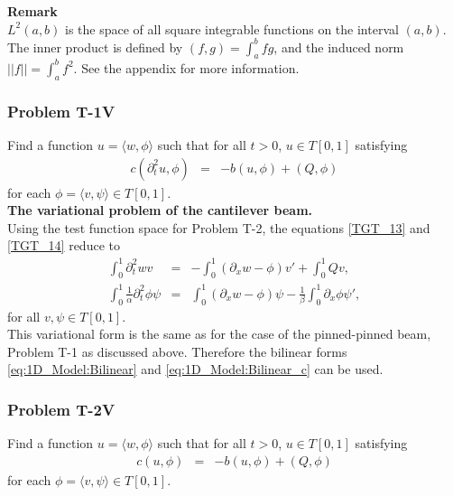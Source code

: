 \documentclass[../../main.tex]{subfiles}
\begin{document}
    \textbf{Remark}\\
    $L^2(a,b)$ is the space of all square integrable functions on the interval $(a,b)$. The inner product is defined by $\displaystyle (f,g) = \int_a^b fg$, and the induced norm $\displaystyle ||f|| = \int_a^b f^2$. See the appendix for more information.\\

    \subsubsection*{Problem T-1V}\label{sssec:1D_Model:ProblemT1V}
    Find a function ${u} = \langle w, \phi \rangle$ such that for all $t >0$, ${u} \in  T[0,1]$ satisfying
    \begin{eqnarray}
        c(\partial_t^2 u,{\phi}) &=& -b({u},{\phi}) + (Q,{\phi})
    \end{eqnarray} for each ${\phi} = \langle v, \psi \rangle \in T[0,1]$. \\

    \textbf{The variational problem of the cantilever beam.}\\

    Using the test function space for Problem T-2, the equations \eqref{TGT_13} and \eqref{TGT_14} reduce to
    \begin{eqnarray}
        \int_{0}^{1} \partial_{t}^{2} w v &=& -\int_{0}^{1}(\partial_x w - \phi) v' + \int_{0}^{1} Q v, \label{eq:1D_Model:ProblemT1V1}\\
        \int_{0}^{1}\frac{1}{\alpha} \partial_{t}^{2} \phi \psi &=&   \int_{0}^{1} (\partial_x w -\phi) \psi - \frac{1}{\beta} \int_{0}^{1}\partial_x \phi \psi',\label{eq:1D_Model:ProblemT1V2}
    \end{eqnarray}
    for all $v, \psi \in T[0,1]$.\\

    This variational form is the same as for the case of the pinned-pinned beam, Problem T-1 as discussed above. Therefore the bilinear forms \eqref{eq:1D_Model:Bilinear} and \eqref{eq:1D_Model:Bilinear_c} can be used.

    \subsubsection*{Problem T-2V}\label{sssec:1D_Model:ProblemT1V}
    Find a function ${u} = \langle w, \phi \rangle$ such that for all $t >0$, ${u} \in  T[0,1]$ satisfying
    \begin{eqnarray}
        c(u,{\phi}) &=& -b({u},{\phi}) + (Q,{\phi}) \label{var_form_timo}
    \end{eqnarray} for each ${\phi} = \langle v, \psi \rangle \in T[0,1]$. \\
\end{document}
